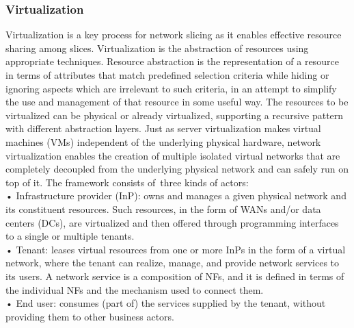 \documentclass{article}
\begin{document}
\subsubsection{Virtualization}
Virtualization is a key process for network slicing
as it enables effective resource sharing among
slices. Virtualization is the abstraction of resources
using appropriate techniques. Resource abstraction is the representation of a resource in terms of
attributes that match predefined selection criteria
while hiding or ignoring aspects which are irrelevant to such criteria, in an attempt to simplify the
use and management of that resource in some
useful way. The resources to be virtualized can
be physical or already virtualized, supporting a
recursive pattern with different abstraction layers.
Just as server virtualization makes virtual
machines (VMs) independent of the underlying
physical hardware, network virtualization enables
the creation of multiple isolated virtual networks that
are completely decoupled from the underlying physical network and can safely run on top of it.
The framework consists of\ three kinds of actors:\\
• Infrastructure provider (InP): owns and manages a given physical network and its constituent resources. Such resources, in the form of
WANs and/or data centers (DCs), are virtualized and then offered through programming
interfaces to a single or multiple tenants.\\
• Tenant: leases virtual resources from one or
more InPs in the form of a virtual network,
where the tenant can realize, manage, and
provide network services to its users. A network service is a composition of NFs, and it
is defined in terms of the individual NFs and
the mechanism used to connect them.\\
• End user: consumes (part of) the services
supplied by the tenant, without providing
them to other business actors.\\
\end{document}
